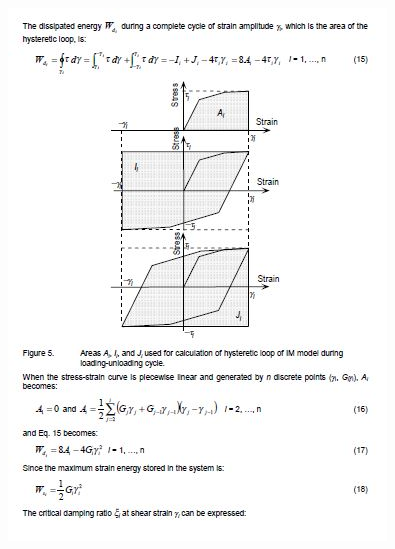 \documentclass[12pt,a4paper]{report}
\begin{document}
\begin{figure}[h!]
	\centering
	\includegraphics[width=1\linewidth]{"NERA 4"}
	\label{Nera4}
\end{figure}
\end{document}
